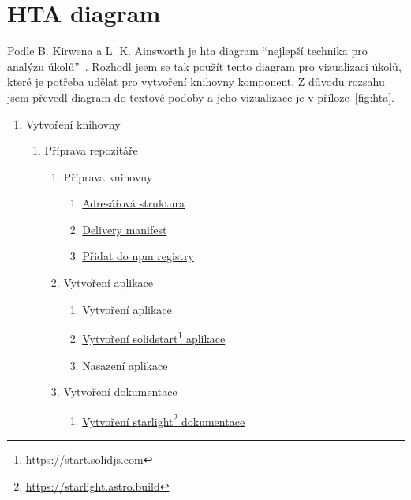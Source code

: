 \section{HTA diagram}

Podle B. Kirwena a L. K. Ainsworth je \gls{hta} diagram ``nejlepší technika pro analýzu úkolů''~\cite{kirwan1992}.
Rozhodl jsem se tak použít tento diagram pro vizualizaci úkolů, které je potřeba udělat pro vytvoření knihovny komponent.
Z důvodu rozsahu jsem převedl diagram do textové podoby a jeho vizualizace je v příloze~\ref{fig:hta}.

\begin{enumerate}[label=\arabic*.]
      \item Vytvoření knihovny
            \begin{enumerate}[label*=\arabic*.]
                  \item Příprava repozitáře
                        \begin{enumerate}[label*=\arabic*.]
                              \item Příprava knihovny
                                    \begin{enumerate}[label*=\arabic*.]
                                          \item \ul{Adresářová struktura}
                                          \item \ul{Delivery manifest}
                                          \item \ul{Přidat do npm registry}
                                    \end{enumerate}
                              \item Vytvoření aplikace
                                    \begin{enumerate}[label*=\arabic*.]
                                          \item \ul{Vytvoření aplikace}
                                          \item \ul{Vytvoření solidstart\footnote{\url{https://start.solidjs.com}} aplikace}
                                          \item \ul{Nasazení aplikace}
                                    \end{enumerate}
                              \item Vytvoření dokumentace
                                    \begin{enumerate}[label*=\arabic*.]
                                          \item \ul{Vytvoření starlight\footnote{\url{https://starlight.astro.build}} dokumentace}

\end{enumerate}
\end{enumerate}
\end{enumerate}
\end{enumerate}
